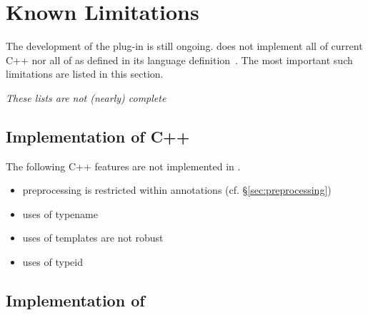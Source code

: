 \chapter{Known Limitations}

The development of the \fclang plug-in is still ongoing.
\fclang does not implement all of current C++ nor all of 
\acslpp as defined in its language definition~\cite{acslpp}.
The most important such limitations are listed in this section.

\textit{These lists are not (nearly) complete}

\section{Implementation of C++}

The following C++ features are not implemented in \acslpp.
\begin{itemize}
\item preprocessing is restricted within \acslpp annotations (cf. \S\ref{sec:preprocessing})
\item uses of typename
\item uses of templates are not robust
\item uses of typeid
\end{itemize}

\section{Implementation of \acslpp}

